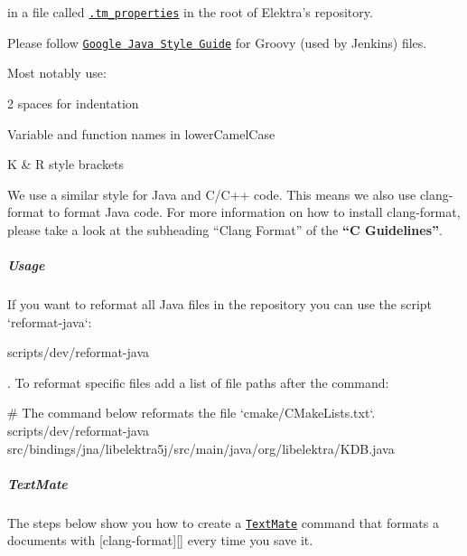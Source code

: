 in a file called \href{https://macromates.com/blog/2011/git-style-configuration}{\tt {\ttfamily .tm\+\_\+properties}} in the root of Elektra’s repository.

Please follow \href{https://google.github.io/styleguide/javaguide.html}{\tt Google Java Style Guide} for Groovy (used by Jenkins) files.

Most notably use\+:


\begin{DoxyItemize}
\item 2 spaces for indentation
\item Variable and function names in lower\+Camel\+Case
\item K \& R style brackets
\end{DoxyItemize}

We use a similar style for Java and C/\+C++ code. This means we also use {\ttfamily clang-\/format} to format Java code. For more information on how to install {\ttfamily clang-\/format}, please take a look at the subheading “\+Clang Format” of the {\bfseries “C Guidelines”}.

\label{invalid_invalid}%
%
\subparagraph*{Usage}

If you want to reformat all Java files in the repository you can use the script `reformat-\/java`\+:


\begin{DoxyCode}
scripts/dev/reformat-java
\end{DoxyCode}


. To reformat specific files add a list of file paths after the command\+:


\begin{DoxyCode}
# The command below reformats the file `cmake/CMakeLists.txt`.
scripts/dev/reformat-java src/bindings/jna/libelektra5j/src/main/java/org/libelektra/KDB.java
\end{DoxyCode}


\subparagraph*{Text\+Mate}

The steps below show you how to create a \href{https://macromates.com}{\tt Text\+Mate} command that formats a documents with \mbox{[}{\ttfamily clang-\/format}\mbox{]}\mbox{[}\mbox{]} every time you save it.


